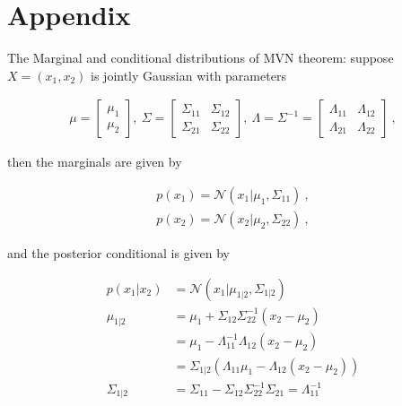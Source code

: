 \documentclass[12pt,letterpaper,fleqn,oneside,titlepage]{offroad-report}
\begin{document}
\appendix
\section{Appendix}
\label{APPENDIX}

The Marginal and conditional distributions of MVN theorem: suppose $X=({x}_1,{x}_2)$ is jointly Gaussian with parameters
\begin{ceqn}
    \begin{align}
        {\mu}=\begin{bmatrix}{\mu}_1 \\ {\mu}_2\end{bmatrix} , \ 
        {\Sigma}=\begin{bmatrix} {\Sigma}_{11} & {\Sigma}_{12} \\ {\Sigma}_{21} & {\Sigma}_{22} \end{bmatrix} , \ 
        {\Lambda}={\Sigma}^{-1}=\begin{bmatrix} {\Lambda}_{11} & {\Lambda}_{12} \\ {\Lambda}_{21} & {\Lambda}_{22} \end{bmatrix} \ , \nonumber
    \end{align}
\end{ceqn}
then the marginals are given by
\begin{ceqn}
    \begin{equation}
        \begin{split}
            p({x}_1)= \mathcal{N}({x}_1|{\mu}_1,{\Sigma}_{11}) \ , \\
            p({x}_2)= \mathcal{N}({x}_2|{\mu}_2,{\Sigma}_{22})  \ , \nonumber
        \end{split}
    \end{equation}
\end{ceqn}
and the posterior conditional is given by

\begin{ceqn}
   \begin{equation}\label{eqn:Marginals-and-conditionals-of-an-MVN}
       \boxed{\begin{split}
        p({x}_1|{x}_2)& =\mathcal{N}({x}_1|{\mu}_{1|2},{\Sigma}_{1|2}) \\
        {\mu}_{1|2}& = {\mu}_1+{\Sigma}_{12}{\Sigma}_{22}^{-1}({x}_2-{\mu}_2) \\
    	               & = {\mu}_1-{\Lambda}_{11}^{-1}{\Lambda}_{12}({x}_2-{\mu}_2) \\
    				   & = {\Sigma}_{1|2}({\Lambda}_{11}{\mu}_1-{\Lambda}_{12}({x}_2-{\mu}_2)) \\
    	{\Sigma}_{1|2}& = {\Sigma}_{11}-{\Sigma}_{12}{\Sigma}_{22}^{-1}{\Sigma}_{21}={\Lambda}_{11}^{-1} \nonumber
       \end{split}}
    \end{equation}
\end{ceqn}



\end{document}
